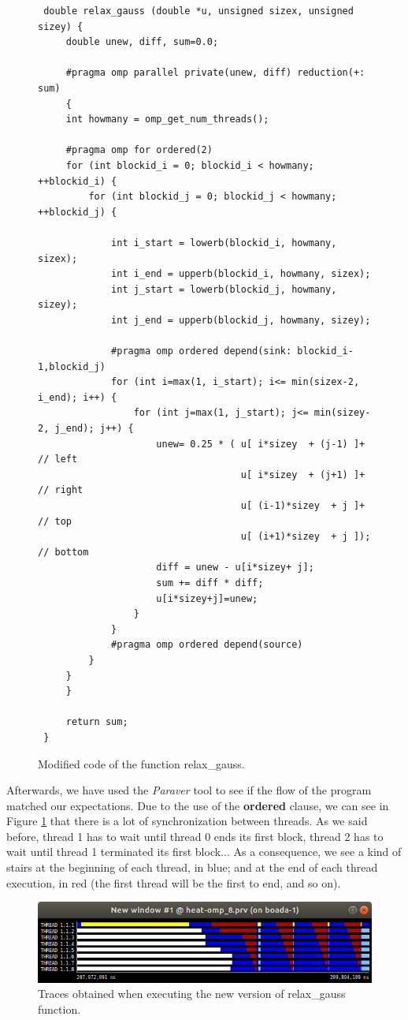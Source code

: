 \documentclass[12pt, a4paper]{article}
\begin{document}
\begin{figure}[H]
\begin{lstlisting}
 double relax_gauss (double *u, unsigned sizex, unsigned sizey) {
     double unew, diff, sum=0.0;
 
     #pragma omp parallel private(unew, diff) reduction(+: sum)
     {
	 int howmany = omp_get_num_threads();
	
	 #pragma omp for ordered(2) 
	 for (int blockid_i = 0; blockid_i < howmany; ++blockid_i) {
		 for (int blockid_j = 0; blockid_j < howmany; ++blockid_j) {
			 
			 int i_start = lowerb(blockid_i, howmany, sizex);
			 int i_end = upperb(blockid_i, howmany, sizex);
			 int j_start = lowerb(blockid_j, howmany, sizey);
			 int j_end = upperb(blockid_j, howmany, sizey);
			
			 #pragma omp ordered depend(sink: blockid_i-1,blockid_j)
			 for (int i=max(1, i_start); i<= min(sizex-2, i_end); i++) {
				 for (int j=max(1, j_start); j<= min(sizey-2, j_end); j++) {
					 unew= 0.25 * ( u[ i*sizey	+ (j-1) ]+  // left
								    u[ i*sizey	+ (j+1) ]+  // right
								    u[ (i-1)*sizey	+ j ]+  // top
								    u[ (i+1)*sizey	+ j ]); // bottom
					 diff = unew - u[i*sizey+ j];
					 sum += diff * diff; 
					 u[i*sizey+j]=unew;
				 }
			 }
			 #pragma omp ordered depend(source)
		 }
	 }
	 }
 
     return sum;
 }
\end{lstlisting}
\caption{Modified code of the function relax\_gauss.}
\end{figure}
 
Afterwards, we have used the \textit{Paraver} tool to see if the flow of the program matched our expectations. Due to the use of the \textbf{ordered} clause, we can see in Figure \ref{fig:trace-gauss-seidel-S4} that there is a lot of synchronization between threads. As we said before, thread 1 has to wait until thread 0 ends its first block, thread 2 has to wait until thread 1 terminated its first block... As a consequence, we see a kind of stairs at the beginning of each thread, in blue; and at the end of each thread execution, in red (the first thread will be the first to end, and so on).

\begin{figure}[H]
	\centering
	\includegraphics[scale=0.5]{./images/paraver-jacobi-s2-4}
	\caption{Traces obtained when executing the new version of relax\_gauss function.}
	\label{fig:trace-gauss-seidel-S4}
\end{figure}
\end{document}
